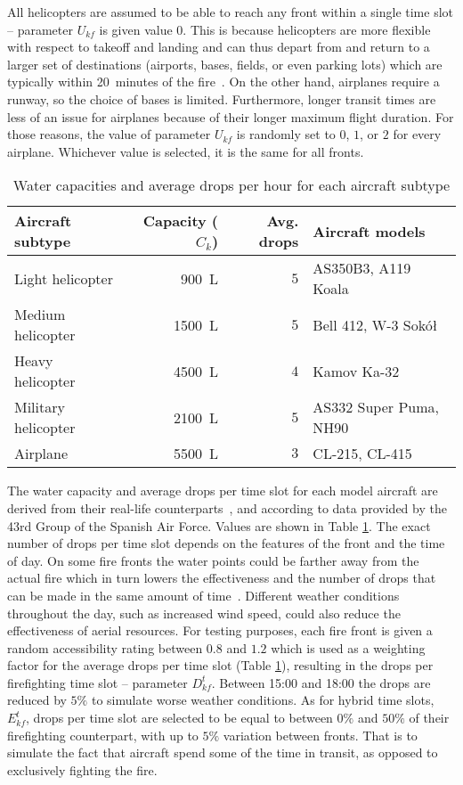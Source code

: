 All helicopters are assumed to be able to reach any front within a single time slot -- parameter $U_{kf}$ is given value $0$.
This is because helicopters are more flexible with respect to takeoff and landing and can thus depart from and return to a larger set of destinations (airports, bases, fields, or even parking lots) which are typically within 20~minutes of the fire~\cite{INFOCACongreso2017}.
On the other hand, airplanes require a runway, so the choice of bases is limited.
Furthermore, longer transit times are less of an issue for airplanes because of their longer maximum flight duration.
For those reasons, the value of parameter $U_{kf}$ is randomly set to $0$, $1$, or $2$ for every airplane.
Whichever value is selected, it is the same for all fronts.

\begin{table}[htb]
\caption{Water capacities and average drops per hour for each aircraft subtype}
\label{tbl:capacity-and-droprate}
\centering
\small
\begin{tabular}{lrrl}
Aircraft subtype    & Capacity ($C_k$) & Avg. drops & Aircraft models \\
\midrule
Light helicopter    & \SI{900}{\liter}  & $5$ & AS350B3, A119 Koala \\
Medium helicopter   & \SI{1500}{\liter} & $5$ & Bell 412, W-3 Sokół \\
Heavy helicopter    & \SI{4500}{\liter} & $4$ & Kamov Ka-32 \\
Military helicopter & \SI{2100}{\liter} & $5$ & AS332 Super Puma, NH90 \\
Airplane            & \SI{5500}{\liter} & $3$ & CL-215, CL-415 \\
\end{tabular}
\end{table}

The water capacity and average drops per time slot for each model aircraft are derived from their real-life counterparts~\cite{Frias/Capacities, Sanz/Helicopters, Merida/Evaluation}, and according to data provided by the 43rd Group of the Spanish Air Force.
Values are shown in Table \ref{tbl:capacity-and-droprate}.
The exact number of drops per time slot depends on the features of the front and the time of day.
On some fire fronts the water points could be farther away from the actual fire which in turn lowers the effectiveness and the number of drops that can be made in the same amount of time~\cite{Merida/Evaluation}.
Different weather conditions throughout the day, such as increased wind speed, could also reduce the effectiveness of aerial resources.
For testing purposes, each fire front is given a random accessibility rating between $0.8$ and $1.2$ which is used as a weighting factor for the average drops per time slot (Table \ref{tbl:capacity-and-droprate}), resulting in the drops per firefighting time slot -- parameter $D_{kf}^t$.
Between 15:00 and 18:00 the drops are reduced by $5\%$ to simulate worse weather conditions.
As for hybrid time slots, $E_{kf}^t$, drops per time slot are selected to be equal to between $0\%$ and $50\%$ of their firefighting counterpart, with up to $5\%$ variation between fronts.
That is to simulate the fact that aircraft spend some of the time in transit, as opposed to exclusively fighting the fire.


